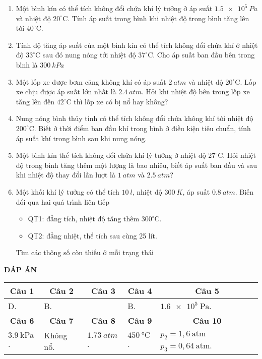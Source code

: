 \begin{enumerate}
	\item %
	Một bình kín có thể tích không đổi chứa khí lý tưởng ở áp suất $\SI{1,5e5}{Pa}$ và nhiệt độ $20^\circ\text{C}$. Tính áp suất trong bình khi nhiệt độ trong bình tăng lên tới $40^\circ\text{C}$.
	\item %
	Tính độ tăng áp suất của một bình kín có thể tích không đổi chứa khí ở nhiệt độ $33^\circ\text{C}$ sau đó nung nóng tới nhiệt độ $37^\circ\text{C}$. Cho áp suất ban đầu bên trong bình là $\SI{300}{kPa}$
	\item %
	Một lốp xe được bơm căng không khí có áp suất $\SI{2}{atm}$ và nhiệt độ $20^\circ\text{C}$. Lốp xe chịu được áp suất lớn nhất là $\SI{2,4}{atm}$. Hỏi khi nhiệt độ bên trong lốp xe tăng lên đến $42^\circ\text{C}$ thì lốp xe có bị nổ hay không?
	\item %
	Nung nóng bình thủy tinh có thể tích không đổi chứa không khí tới nhiệt độ $200^\circ\text{C}$. Biết ở thời điểm ban đầu khí trong bình ở điều kiện tiêu chuẩn, tính áp suất khí trong bình sau khi nung nóng.
	\item %
	Một bình kín thể tích không đổi chứa khí lý tưởng ở nhiệt độ $27^\circ\text{C}$. Hỏi nhiệt độ trong bình tăng thêm một lượng là bao nhiêu, biết áp suất ban đầu và sau khi nhiệt độ thay đổi lần lượt là $\SI{1}{atm}$ và $\SI{2,5}{atm}$?
	\item %
	Một khối khí lý tưởng có thể tích $\SI{10}{l}$, nhiệt độ $\SI{300}{K}$, áp suất $\SI{0,8}{atm}$. Biến đổi qua hai quá trình liên tiếp
	\begin{itemize}
		\item QT1: đẳng tích, nhiệt độ tăng thêm $300^\circ\text{C}$.
		\item QT2: đẳng nhiệt, thể tích sau cùng 25 lít.
	\end{itemize}
	Tìm các thông số còn thiếu ở mỗi trạng thái	
\end{enumerate}
\textbf{ĐÁP ÁN}
\begin{longtable}[\textwidth]{|p{}|p{}|p{}|p{}|p{}|}
	\hline%
	\multicolumn{1}{|c}{\textbf{Câu 1}} & \multicolumn{1}{|c|}{\textbf{Câu 2}} & \multicolumn{1}{c|}{\textbf{Câu 3}} &
	\multicolumn{1}{c|}{\textbf{Câu 4}} &
	\multicolumn{1}{c|}{\textbf{Câu 5}} \\
	\hline
	D.& B. &  & B. & $\SI{1.6e5}{\pascal}$. 	\\
	\hline
	
	\multicolumn{1}{|c|}{\textbf{Câu 6}} & \multicolumn{1}{c|}{\textbf{Câu 7}} & \multicolumn{1}{c|}{\textbf{Câu 8}} &
	\multicolumn{1}{c|}{\textbf{Câu 9}} &
	\multicolumn{1}{c|}{\textbf{Câu 10}} \\ 
	\hline
	$\SI{3.9}{\kilo \pascal}$.  & Không nổ. & $\SI{1.73}{atm}$.&$\SI{450}{\celsius}$. & $p_2=1,6\ \text{atm}$ \newline $p_3=0,64\ \text{atm}$. \\
	\hline
\end{longtable}		
